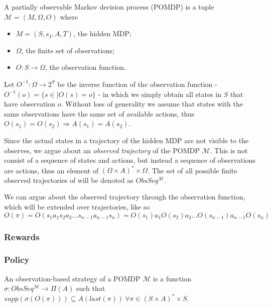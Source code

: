 \begin{definition}[POMDP]
	A partially observable Markov decision process (POMDP) is a tuple $\mathcal{M}=(M, \Omega, O)$ where 
	\begin{itemize}
		\item $M=(S,s_I,A,T)$, the hidden MDP;
		\item $\Omega$, the finite set of observations;
		\item $O:S\to \Omega$, the observation function. 
	\end{itemize}
\end{definition}

Let $O^{-1}:\Omega\to 2^S$ be the inverse function of the observation function - $O^{-1}(o)=\{s\in \mid O(s)=o\}$ - in which we simply obtain all states in $S$ that have observation $o$.
Without loss of generality we assume that states with the same observations have the same set of available actions, thus $O(s_1)=O(s_2)\Rightarrow A(s_1)=A(s_2)$.

Since the actual states in a trajectory of the hidden MDP are not visible to the observes, we argue about an \textit{observed trajectory} of the POMDP $\mathcal{M}$. This is not consist of a sequence of states and actions, but instead a sequence of observations are actions, thus an element of $(\Omega\times A)^*\times \Omega$. The set of all possible finite observed trajectories of will be denoted as $ObsSeq^{\mathcal{M}}$.

We can argue about the observed trajectory through the observation function, which will be extended over trajectories, like so
\[O(\pi)=O(s_1 a_1 s_2 a_2\dots s_{n-1} a_{n-1} s_n) = O(s_1) a_1 O(s_2) a_2\dots O(s_{n-1}) a_{n-1} O(s_n)\]

\subsubsection*{Rewards}

\subsubsection*{Policy}

\begin{definition}
	An observation-based strategy of a POMDP $\mathcal{M}$ is a function $\sigma:ObsSeq^{\mathcal{M}}\to\Pi(A)$ such that $supp(\sigma(O(\pi)))\subseteq A (last(\pi))\ \forall \pi\in(S\times A)^*\times S$.
\end{definition}

